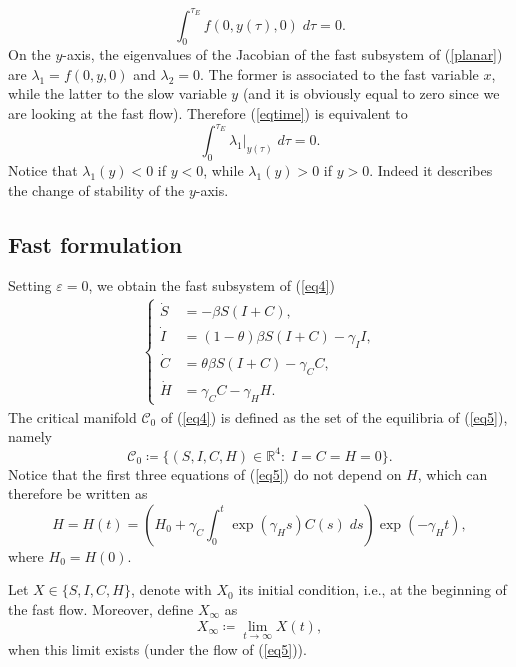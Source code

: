 \documentclass[11pt,reqno]{amsart}
\theoremstyle{boldremark}
\begin{document}
\begin{equation} \label{eqtime}
    \int_0^{\tau_E} f(0,y(\tau),0) \; d\tau = 0. 
\end{equation}
On the $y$-axis, the eigenvalues of the Jacobian of the fast subsystem of (\ref{planar}) are $\lambda_1=f(0,y,0)$ and $\lambda_2=0$. The former is associated to the fast variable $x$, while the latter to the slow variable $y$ (and it is obviously equal to zero since we are looking at the fast flow). Therefore (\ref{eqtime}) is equivalent to 
\begin{equation} \label{eqtime_eig}
    \int_0^{\tau_E} \lambda_1|_{y(\tau)} \; d\tau = 0. 
\end{equation}
Notice that $\lambda_1(y)<0$ if $y<0$, while $\lambda_1(y)>0$ if $y>0$. Indeed it describes the change of stability of the $y$-axis.  

\subsection{Fast formulation} \label{subfast}

\noindent Setting $\varepsilon=0$, we obtain the fast subsystem of (\ref{eq4}) 
\begin{align} \label{eq5}
\left\{
\begin{aligned}
    \dot{S} &= -\beta S (I+C), \\ 
    \dot{I} &= (1-\theta)\beta S (I+C) - \gamma_I I, \\ 
    \dot{C} &= \theta \beta S(I+C) - \gamma_C C, \\ 
    \dot{H} &= \gamma_C C - \gamma_H H.
\end{aligned}
\right.
\end{align}
The critical manifold $\mathcal{C}_0$ of (\ref{eq4}) is defined as the set of the equilibria of (\ref{eq5}), namely 
\begin{equation*}
    \mathcal{C}_0 \coloneqq \{(S,I,C,H) \in \mathbb{R}^4 \colon \; I=C=H=0\}. 
\end{equation*}
Notice that the first three equations of (\ref{eq5}) do not depend on $H$, which can therefore be written as 
\begin{equation*}
    H=H(t)=\left(H_0 + \gamma_C \int_0^t \exp(\gamma_H s) C(s) \; ds\right) \exp(-\gamma_H t), 
\end{equation*}
where $H_0=H(0)$. 

Let $X \in \{S,I,C,H\}$, denote with $X_0$ its initial condition, i.e., at the beginning of the fast flow. Moreover, define $X_\infty$ as 
\begin{equation*}
    X_\infty \coloneqq \lim_{t \to \infty} X(t), 
\end{equation*}
when this limit exists (under the flow of (\ref{eq5})). 
\end{document}
